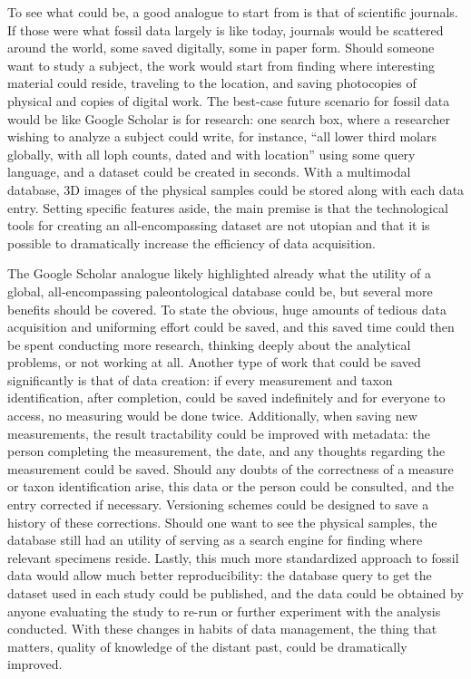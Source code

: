 \documentclass[english,twoside,openright]{UH_DS_MSc}
\begin{document}
To see what could be, a good analogue to start from is that of scientific journals. If those were what fossil data largely is like today, journals would be scattered around the world, some saved digitally, some in paper form. Should someone want to study a subject, the work would start from finding where interesting material could reside, traveling to the location, and saving photocopies of physical and copies of digital work. The best-case future scenario for fossil data would be like Google Scholar is for research: one search box, where a researcher wishing to analyze a subject could write, for instance, ``all lower third molars globally, with all loph counts, dated and with location'' using some query language, and a dataset could be created in seconds. With a multimodal database, 3D images of the physical samples could be stored along with each data entry. Setting specific features aside, the main premise is that the technological tools for creating an all-encompassing dataset are not utopian and that it is possible to dramatically increase the efficiency of data acquisition.

The Google Scholar analogue likely highlighted already what the utility of a global, all-encompassing paleontological database could be, but several more benefits should be covered. To state the obvious, huge amounts of tedious data acquisition and uniforming effort could be saved, and this saved time could then be spent conducting more research, thinking deeply about the analytical problems, or not working at all. Another type of work that could be saved significantly is that of data creation: if every measurement and taxon identification, after completion, could be saved indefinitely and for everyone to access, no measuring would be done twice. Additionally, when saving new measurements, the result tractability could be improved with metadata: the person completing the measurement, the date, and any thoughts regarding the measurement could be saved. Should any doubts of the correctness of a measure or taxon identification arise, this data or the person could be consulted, and the entry corrected if necessary. Versioning schemes could be designed to save a history of these corrections. Should one want to see the physical samples, the database still had an utility of serving as a search engine for finding where relevant specimens reside. Lastly, this much more standardized approach to fossil data would allow much better reproducibility: the database query to get the dataset used in each study could be published, and the data could be obtained by anyone evaluating the study to re-run or further experiment with the analysis conducted. With these changes in habits of data management, the thing that matters, quality of knowledge of the distant past, could be dramatically improved.
\end{document}
